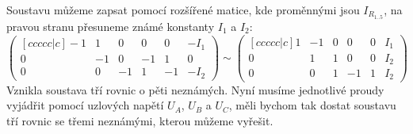 Soustavu můžeme zapsat pomocí rozšířené matice, kde proměnnými jsou $I_{R_{1..5}}$, na pravou stranu přesuneme známé konstanty $I_1$ a $I_2$:
\begin{equation} \label{eq:circ-3-matrices}
\begin{pmatrix}[ccccc|c]
    -1 &  1 &  0 &  0 &  0 & -I_1 \\
     0 & -1 &  0 & -1 &  1 &  0 \\
     0 &  0 & -1 &  1 & -1 & -I_2
\end{pmatrix}
\sim
\begin{pmatrix}[ccccc|c]
     1 & -1 &  0 &  0 &  0 & I_1 \\
     0 &  1 &  1 &  0 &  0 & I_2 \\
     0 &  0 &  1 & -1 &  1 & I_2
\end{pmatrix}
\end{equation}
Vznikla soustava tří rovnic o pěti neznámých. Nyní musíme jednotlivé proudy vyjádřit pomocí uzlových napětí $U_A$, $U_B$ a $U_C$, měli bychom tak dostat soustavu tří rovnic se třemi neznámými, kterou můžeme vyřešit.

